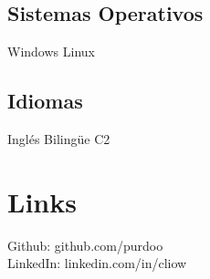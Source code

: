 \documentclass[letterpaper]{deedy-resume} %
\begin{document}
\begin{minipage}[t]{0.42\textwidth}
\sectionspace
\subsection{Sistemas Operativos}
Windows \textbullet{} Linux

\sectionspace
\subsection{Idiomas}
Inglés Bilingüe C2

\sectionspace %

\section{Links} 

Github: github.com/purdoo \\
LinkedIn: linkedin.com/in/cliow \\


\sectionspace %


\end{minipage} %
\hfill
%
%
\end{document}
